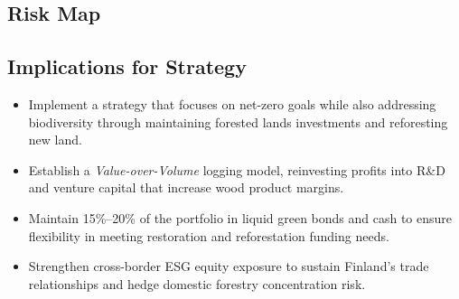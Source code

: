 \subsection*{Risk Map}
\begin{table}[h!]
\centering
{}
\caption{Principal risk channels and qualitative exposure assessment.}
\end{table}


\subsection*{Implications for Strategy }
\begin{itemize}[leftmargin=*, itemsep=2pt]
    \item Implement a strategy that focuses on net-zero goals while also addressing biodiversity through maintaining forested lands investments and reforesting new land.
    \item Establish a \emph{Value-over-Volume} logging model, reinvesting profits into R\&D and venture capital that increase wood product margins.
    \item Maintain 15\%–20\% of the portfolio in liquid green bonds and cash to ensure flexibility in meeting restoration and reforestation funding needs.
    \item Strengthen cross-border ESG equity exposure to sustain Finland’s trade relationships and hedge domestic forestry concentration risk.
    
\end{itemize}
